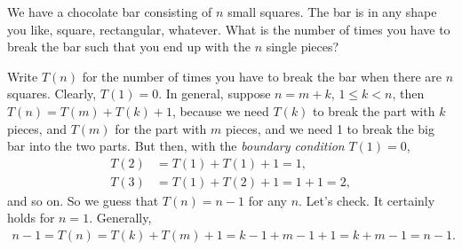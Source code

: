 \documentclass[lectures]{subfiles}
\begin{document}
\begin{exercise}
We have a chocolate bar consisting of $n$ small squares.
The bar is in any shape you like, square, rectangular, whatever.
What is the number of times you have to break the bar such that you end up with the $n$ single pieces?
\begin{solution}
  Write $T(n)$ for the number of times you have to break the bar when there are $n$ squares.
  Clearly, $T(1) =0$.
  In general, suppose $n=m+k$, $1 \leq k < n$, then $T(n) = T(m) + T(k) + 1$, because we need $T(k)$ to break the part with $k$ pieces, and $T(m)$ for the part with $m$ pieces, and we need 1 to break the big bar into the two parts. But then, with the \emph{boundary condition} $T(1)=0$,
  \begin{align*}
    T(2) &= T(1) + T(1) + 1 = 1, \\
T(3) &= T(1) + T(2) + 1 = 1 + 1 = 2,
  \end{align*}
and so on. So we guess that $T(n)=n-1$ for any $n$. Let's check. It certainly holds for $n=1$.  Generally,
\begin{align*}
n-1 = T(n) = T(k) + T(m) + 1 = k-1 + m-1 + 1 = k+m-1 = n-1.
\end{align*}
\end{solution}
\end{exercise}
\end{document}
